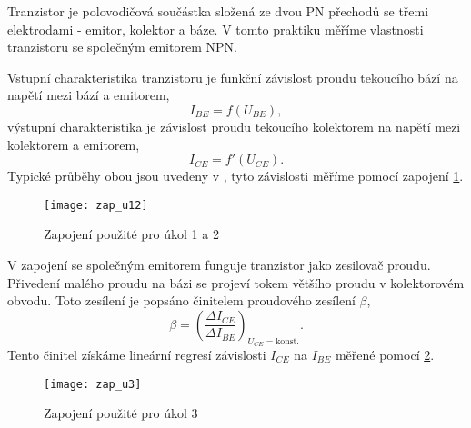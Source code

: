\documentclass[0-protokol.tex]{subfiles}
\begin{document}
Tranzistor je polovodičová součástka složená ze dvou PN přechodů se třemi elektrodami - emitor, kolektor a báze. V tomto praktiku měříme vlastnosti tranzistoru se společným emitorem NPN.

Vstupní charakteristika tranzistoru je funkční závislost proudu tekoucího bází na napětí mezi bází a emitorem,
\begin{equation}
I_{BE} = f(U_{BE}),
\end{equation}
výstupní charakteristika je závislost proudu tekoucího kolektorem na napětí mezi kolektorem a emitorem,
\begin{equation}
I_{CE} = f'(U_{CE}). 
\end{equation}
Typické průběhy obou jsou uvedeny v \cite{stud_text}, tyto závislosti měříme pomocí zapojení \ref{fig:zap_u12}.

\begin{figure}[H]
\centering
\texttt{[image: zap\_u12]}
\caption{Zapojení použité pro úkol 1 a 2}
\label{fig:zap_u12}
\end{figure}

V zapojení se společným emitorem funguje tranzistor jako zesilovač proudu. Přivedení malého proudu na bázi se projeví tokem většího proudu v kolektorovém obvodu. Toto zesílení je popsáno činitelem proudového zesílení $\beta$,
\begin{equation}
\beta = \left(\frac{\Delta I_{CE}}{\Delta I_{BE}}\right)_{U_{CE} = \text{konst.}}.
\end{equation}
Tento činitel získáme lineární regresí závislosti $I_{CE}$ na $I_{BE}$ měřené pomocí \ref{fig:zap_u3}.

\begin{figure}[H]
\centering
\texttt{[image: zap\_u3]}
\caption{Zapojení použité pro úkol 3}
\label{fig:zap_u3}
\end{figure}
\end{document}
